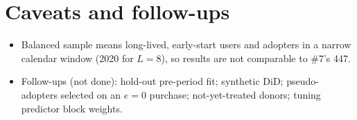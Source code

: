 \documentclass[11pt]{article}
\begin{document}
\section{Caveats and follow-ups}
\begin{itemize}[nosep]
\item Balanced sample means long-lived, early-start users and adopters in a narrow calendar window (2020 for $L=8$), so results are not comparable to \#7's 447.
\item Follow-ups (not done): hold-out pre-period fit; synthetic DiD; pseudo-adopters selected on an $e=0$ purchase; not-yet-treated donors; tuning predictor block weights.
\end{itemize}
\end{document}
